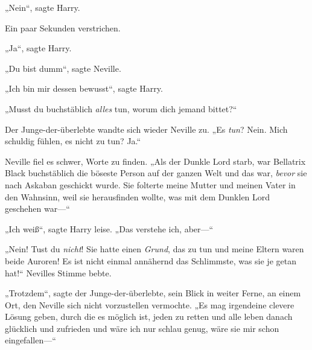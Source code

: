 „Nein“, sagte Harry.

Ein paar Sekunden verstrichen.

„Ja“, sagte Harry.

„Du bist dumm“, sagte Neville.

„Ich bin mir dessen bewusst“, sagte Harry.

„Musst du buchstäblich \emph{alles} tun, worum dich jemand bittet?“

Der Junge-der-überlebte wandte sich wieder Neville zu. „Es \emph{tun}? Nein. Mich schuldig fühlen, es nicht zu tun? Ja.“

Neville fiel es schwer, Worte zu finden. „Als der Dunkle Lord starb, war Bellatrix Black buchstäblich die böseste Person auf der ganzen Welt und das war, \emph{bevor} sie nach Askaban geschickt wurde. Sie folterte meine Mutter und meinen Vater in den Wahnsinn, weil sie herausfinden wollte, was mit dem Dunklen Lord geschehen war—“

„Ich weiß“, sagte Harry leise. „Das verstehe ich, aber—“

„Nein! Tust du \emph{nicht}! Sie hatte einen \emph{Grund}, das zu tun und meine Eltern waren beide Auroren! Es ist nicht einmal annähernd das Schlimmste, was sie je getan hat!“ Nevilles Stimme bebte.

„Trotzdem“, sagte der Junge-der-überlebte, sein Blick in weiter Ferne, an einem Ort, den Neville sich nicht vorzustellen vermochte. „Es mag irgendeine clevere Lösung geben, durch die es möglich ist, jeden zu retten und alle leben danach glücklich und zufrieden und wäre ich nur schlau genug, wäre sie mir schon eingefallen—“

